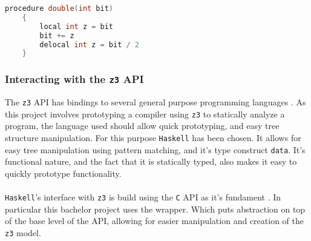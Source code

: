 \begin{lstlisting}[language=C]
    procedure double(int bit)
    {
        local int z = bit
        bit += z
        delocal int z = bit / 2
    }
\end{lstlisting}

\subsubsection{Interacting with the \texttt{z3} API} \label{sec:z3interaction}
The \texttt{z3} API has bindings to several general purpose programming languages \cite{z3:api}.
As this project involves prototyping a compiler using \texttt{z3} to statically analyze a program,
the language used should allow quick prototyping, and easy tree structure manipulation. For this
purpose \texttt{Haskell} has been chosen. It allows for easy tree manipulation using pattern
matching, and it's type construct \texttt{data}. It's functional nature, and the fact that it is
statically typed, also makes it easy to quickly prototype functionality.
\\
\\
\texttt{Haskell}'s interface with \texttt{z3} is build using the \texttt{C} API as it's fundament
\cite{z3:api2}. In particular this bachelor project uses the  wrapper.
Which puts abstraction on top of the base level of the API, allowing for easier manipulation
and creation of the \texttt{z3} model.


